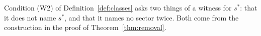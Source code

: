 
Condition (W2) of Definition~\ref{def:classes} asks two things of a witness
for $s^{*}$: that it does not name $s^{*}$, and that it names no sector
twice. Both come from the construction in the proof of
Theorem~\ref{thm:removal}.

